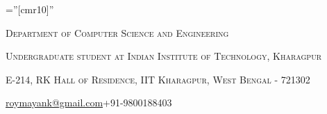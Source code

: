 \documentclass[a4paper,10pt]{extarticle} %
\begin{document}
\pagestyle{empty} %

\font\fb=''[cmr10]'' %


\par{\par} %
\par{\centering\large {\textsc{Department of Computer Science and Engineering}}\par}\large
\par{\centering\large {\textsc{Undergraduate student at Indian Institute of Technology, Kharagpur}}\par}\large
\par{\centering\large {\textsc{E-214, RK Hall of Residence, IIT Kharagpur, West Bengal - 721302}}\par}\large
\hspace{3.5cm}\normalsize {\href{mailto:mayank.roy812@gmail.com}{roymayank@gmail.com}}\hfill{+91-9800188403}\hspace{3.5cm}

%

\end{document}
